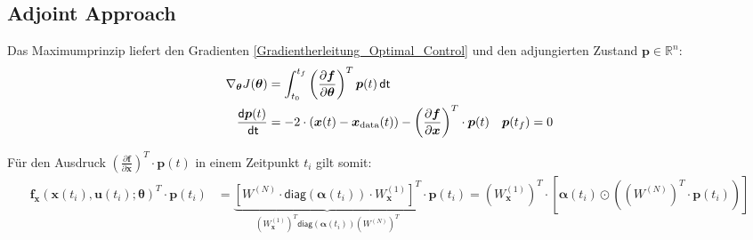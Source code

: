 \documentclass[a4paper, 12pt]{scrartcl}
\newcommand{\dt}{\thinspace \mathsf{dt}}
\begin{document}
\subsection{Adjoint Approach}

Das Maximumprinzip liefert den Gradienten 
\ref{Gradientherleitung_Optimal_Control} 
und den adjungierten Zustand $\bm{p} \in \mathbb{R}^n$:
\begin{align*}
    \nabla_{\bm{\theta}} J(\bm{\theta}) 
    &=
    \int_{t_0}^{t_f} 
    \left(
        \frac{\partial \bm{f}}{\partial \bm{\theta}}
    \right)^T \bm{p}(t) \dt 
    \\
    \frac{\mathsf{d}\bm{p}(t)}{\dt}
    &= 
    -2 \cdot (\bm{x}(t) - \bm{x}_{\text{data}}(t)) 
    - \left(\frac{\partial \bm{f}}{\partial \bm{x}}\right)^T \cdot \bm{p}(t)
    \quad
    \bm{p}(t_f) = 0
\end{align*}

Für den Ausdruck $\left(\frac{\partial \bm{f}}{\partial \bm{x}}\right)^T \cdot \bm{p}(t)$ in einem 
Zeitpunkt $t_i$ gilt somit:
% 
\begin{align*}
    \bm{f}_{\bm{x}}(\bm{x}(t_i),\bm{u}(t_i); \bm{\theta})^T 
    \cdot
    \bm{p}(t_i)
    &=
    \underbrace{
        \left[
            W^{(N)} 
            \cdot
            \mathsf{diag}
            \left(
                \bm{\alpha}(t_i)
            \right)
            \cdot 
            W_{\bm{x}}^{(1)}
        \right]^T
    }_{
        \left(W_{\bm{x}}^{(1)}\right)^T
            \mathsf{diag}
        \left(
            \bm{\alpha}(t_i)
        \right)
        \left(W^{(N)}\right)^T
    }
    \cdot
    \bm{p}(t_i)
    =
    \left(W_{\bm{x}}^{(1)}\right)^T
    \cdot
    \left[
        \bm{\alpha}(t_i)
        \odot 
        \left(
            \left(W^{(N)}\right)^T
            \cdot
            \bm{p}(t_i)
        \right)
    \right]
\end{align*}
\end{document}

